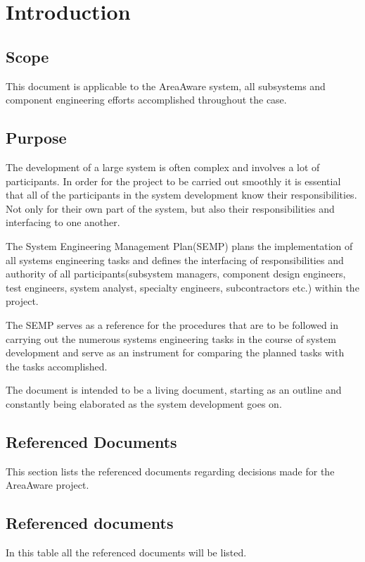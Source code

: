 %
\thispagestyle{fancy}
\chapter{Introduction}
\label{chp:intro}


\section{Scope}
This document is applicable to the AreaAware system, all subsystems and component engineering efforts accomplished throughout the case.

\section{Purpose}
The development of a large system is often complex and involves a lot of participants.
In order for the project to be carried out smoothly it is essential that all of the participants in the system development know their responsibilities.
Not only for their own part of the system, but also their responsibilities and interfacing to one another.

The System Engineering Management Plan(SEMP) plans the implementation of all systems engineering tasks and defines the interfacing of responsibilities and authority of all participants(subsystem managers, component design engineers, test engineers, system analyst, specialty engineers, subcontractors etc.) within the project.

The SEMP serves as a reference for the procedures that are to be followed in carrying out the numerous systems engineering tasks in the course of system development and serve as an instrument for comparing the planned tasks with the tasks accomplished.

The document is intended to be a living document, starting as an outline and constantly being elaborated as the system development goes on.

\section{Referenced Documents}
This section lists the referenced documents regarding decisions made for the AreaAware project.
\section{Referenced documents}
In this table all the referenced documents will be listed.

